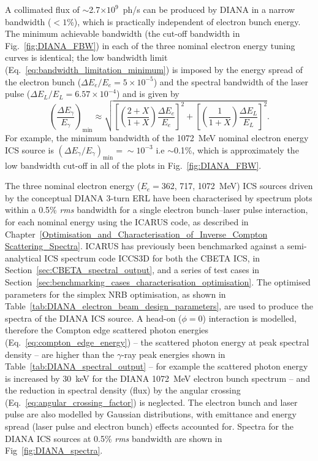 \documentclass[../main.tex]{subfiles}
\begin{document}
A collimated flux of $\sim$2.7$\times 10^{9}$~ph/\si{\second} can be produced by DIANA in a narrow bandwidth ($<1$\%), which is practically independent of electron bunch energy. The minimum achievable bandwidth (the cut-off bandwidth in Fig.~\ref{fig:DIANA_FBW}) in each of the three nominal electron energy tuning curves is identical; the low bandwidth limit (Eq.~\ref{eq:bandwidth_limitation_minimum}) is imposed by the energy spread of the electron bunch ($\Delta E_{e}/E_{e} = 5\times 10^{-5}$) and the spectral bandwidth of the laser pulse ($\Delta E_{L}/E_{L}=6.57\times 10^{-4}$) and is given by   
\begin{equation*}
\left(\frac{\Delta E_{\gamma}}{E_{\gamma}}\right)_{\mathrm{min}} \approx \sqrt{\left[\left(\frac{2+X}{1+X}\right)\frac{\Delta E_{e}}{E_{e}}\right]^{2} + \left[\left(\frac{1}{1+X}\right)\frac{\Delta E_{L}}{E_{L}}\right]^{2}}.
\end{equation*}
For example, the minimum bandwidth of the 1072~\si{\mega\electronvolt} nominal electron energy ICS source is $\left(\Delta E_{\gamma}/E_{\gamma}\right)_{\mathrm{min}} = \sim 10^{-3}$ i.e $\sim$0.1\%, which is approximately the low bandwidth cut-off in all of the plots in Fig.~\ref{fig:DIANA_FBW}. 
   
The three nominal electron energy ($E_{e} = $362, 717, 1072~\si{\mega\electronvolt}) ICS sources driven by the conceptual DIANA 3-turn ERL have been characterised by spectrum plots within a 0.5\% \textit{rms} bandwidth for a single electron bunch--laser pulse interaction, for each nominal energy using the \textsc{ICARUS} code, as described in Chapter~\ref{Optimisation_and_Characterisation_of_Inverse_Compton Scattering_Spectra}. \textsc{ICARUS} has previously been benchmarked against a semi-analytical ICS spectrum code \textsc{ICCS3D} \cite{krafft2016laser,ranjan2018simulation} for both the CBETA ICS, in Section~\ref{sec:CBETA_spectral_output}, and a series of test cases in Section~\ref{sec:benchmarking_cases_characterisation_optimisation}. The optimised parameters for the simplex NRB optimisation, as shown in Table~\ref{tab:DIANA_electron_beam_design_parameters}, are used to produce the spectra of the DIANA ICS source. A head-on ($\phi=0$) interaction is modelled, therefore the Compton edge scattered photon energies (Eq.~\ref{eq:compton_edge_energy}) -- the scattered photon energy at peak spectral density -- are higher than the $\gamma$-ray peak energies shown in Table~\ref{tab:DIANA_spectral_output} -- for example the scattered photon energy is increased by 30~\si{\kilo\electronvolt} for the DIANA 1072~\si{\mega\electronvolt} electron bunch spectrum -- and the reduction in spectral density (flux) by the angular crossing (Eq.~\ref{eq:angular_crossing_factor}) is neglected. The electron bunch and laser pulse are also modelled by Gaussian distributions, with emittance and energy spread (laser pulse and electron bunch) effects accounted for. Spectra for the DIANA ICS sources at 0.5\% \textit{rms} bandwidth are shown in Fig~\ref{fig:DIANA_spectra}.
\end{document}
